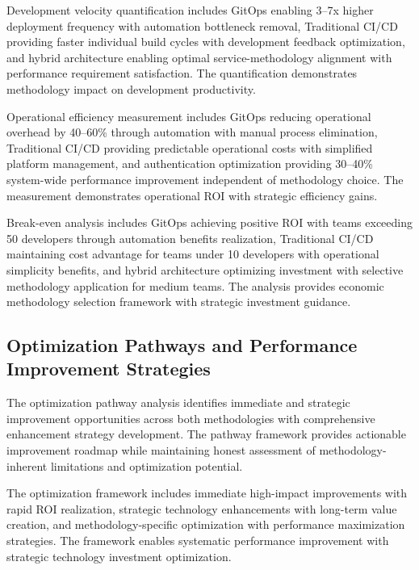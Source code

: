 Development velocity quantification includes GitOps enabling 3--7x higher deployment frequency with automation bottleneck removal, Traditional CI/CD providing faster individual build cycles with development feedback optimization, and hybrid architecture enabling optimal service-methodology alignment with performance requirement satisfaction. The quantification demonstrates methodology impact on development productivity.

Operational efficiency measurement includes GitOps reducing operational overhead by 40--60\% through automation with manual process elimination, Traditional CI/CD providing predictable operational costs with simplified platform management, and authentication optimization providing 30--40\% system-wide performance improvement independent of methodology choice. The measurement demonstrates operational ROI with strategic efficiency gains.

Break-even analysis includes GitOps achieving positive ROI with teams exceeding 50 developers through automation benefits realization, Traditional CI/CD maintaining cost advantage for teams under 10 developers with operational simplicity benefits, and hybrid architecture optimizing investment with selective methodology application for medium teams. The analysis provides economic methodology selection framework with strategic investment guidance.


\subsection{Optimization Pathways and Performance Improvement Strategies}
\label{subsec:optimization_pathways}

The optimization pathway analysis identifies immediate and strategic improvement opportunities across both methodologies with comprehensive enhancement strategy development. The pathway framework provides actionable improvement roadmap while maintaining honest assessment of methodology-inherent limitations and optimization potential.

The optimization framework includes immediate high-impact improvements with rapid ROI realization, strategic technology enhancements with long-term value creation, and methodology-specific optimization with performance maximization strategies. The framework enables systematic performance improvement with strategic technology investment optimization.

